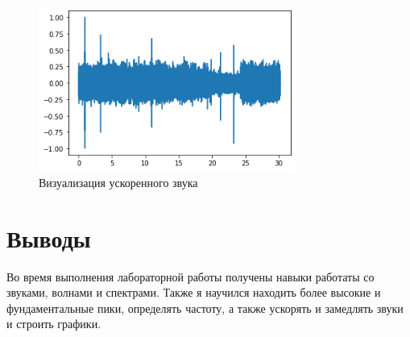 \documentclass[a4paper,12pt]{report}
\begin{document}
\begin{figure}[H]
        \centering
        \includegraphics[width=0.75\textwidth]{lab1_fig4_1.png}
        \caption{Визуализация ускоренного звука}
        \label{fig:lab1_fig4_1}
\end{figure}

\chapter{Выводы}

Во время выполнения лабораторной работы получены навыки работаты со звуками, волнами и спектрами. Также я научился находить более высокие и фундаментальные пики, определять частоту, а также ускорять и замедлять звуки и строить графики.
\end{document}
